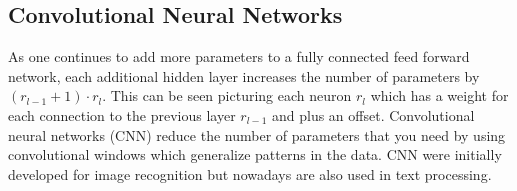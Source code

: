 %
%

\subsection{Convolutional Neural Networks}

As one continues to add more parameters to a fully connected feed forward network, each additional hidden layer increases the number of parameters by $(r_{l-1}+1)\cdot r_l$. This can be seen picturing each neuron $r_l$ which has a weight for each connection to the previous layer $r_{l-1}$ and  plus an offset. Convolutional neural networks (CNN) reduce the number of parameters that you need by using convolutional windows which generalize patterns in the data. CNN were initially developed for image recognition but nowadays are also used in text processing. 

